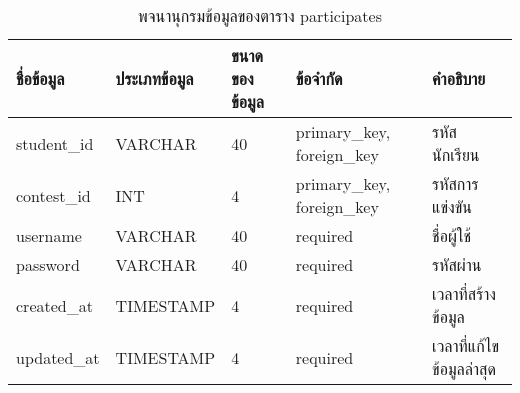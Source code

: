 \begin{table}[H]
    \caption{พจนานุกรมข้อมูลของตาราง participates}
    \label{tab:database-participates}
    \begin{tabularx}{\textwidth}{ | p{2.25cm} | p{2.20cm} | p{2.45cm} | p{2cm} | X | }
    \hline
    \textbf{ชื่อข้อมูล} & \textbf{ประเภทข้อมูล} & \textbf{ขนาดของข้อมูล} & \textbf{ข้อจำกัด} & \textbf{คำอธิบาย} \\
    \hline
    student\_id & VARCHAR & 40 & primary\_key, foreign\_key & รหัสนักเรียน \\
    \hline
    contest\_id & INT & 4 & primary\_key, foreign\_key & รหัสการแข่งขัน \\
    \hline
    username & VARCHAR & 40 & required & ชื่อผู้ใช้ \\
    \hline
    password & VARCHAR & 40 & required & รหัสผ่าน \\
    \hline
    created\_at & TIMESTAMP & 4 & required & เวลาที่สร้างข้อมูล \\
    \hline
    updated\_at & TIMESTAMP & 4 & required & เวลาที่แก้ไขข้อมูลล่าสุด \\
    \hline
    \end{tabularx}
\end{table}